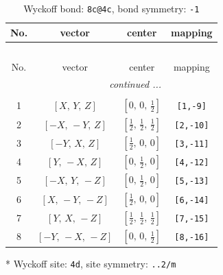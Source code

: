 \documentclass[fleqn,8pt]{jsarticle}
\begin{document}
\begin{longtable}{cccc}
\caption{Wyckoff bond: {\tt 8c@4c}, bond symmetry: {\tt -1}}
 \\
 \hline \hline
No. & vector & center & mapping \\ \hline \endfirsthead

\multicolumn{3}{l}{\tablename\ \thetable{}} \\
 \hline \hline
No. & vector & center & mapping \\ \hline \endhead

 \hline \hline
\multicolumn{3}{r}{\footnotesize\it continued ...} \\ \endfoot

 \hline \hline
\multicolumn{3}{r}{} \\ \endlastfoot

1 & $\left[ X,\, Y,\, Z \right]$ & $\left[ 0,\, 0,\, \frac{1}{2} \right]$ & {\tt [1,-9]} \\ \hline
2 & $\left[ - X,\, - Y,\, Z \right]$ & $\left[ \frac{1}{2},\, \frac{1}{2},\, \frac{1}{2} \right]$ & {\tt [2,-10]} \\ \hline
3 & $\left[ - Y,\, X,\, Z \right]$ & $\left[ \frac{1}{2},\, 0,\, 0 \right]$ & {\tt [3,-11]} \\ \hline
4 & $\left[ Y,\, - X,\, Z \right]$ & $\left[ 0,\, \frac{1}{2},\, 0 \right]$ & {\tt [4,-12]} \\ \hline
5 & $\left[ - X,\, Y,\, - Z \right]$ & $\left[ 0,\, \frac{1}{2},\, 0 \right]$ & {\tt [5,-13]} \\ \hline
6 & $\left[ X,\, - Y,\, - Z \right]$ & $\left[ \frac{1}{2},\, 0,\, 0 \right]$ & {\tt [6,-14]} \\ \hline
7 & $\left[ Y,\, X,\, - Z \right]$ & $\left[ \frac{1}{2},\, \frac{1}{2},\, \frac{1}{2} \right]$ & {\tt [7,-15]} \\ \hline
8 & $\left[ - Y,\, - X,\, - Z \right]$ & $\left[ 0,\, 0,\, \frac{1}{2} \right]$ & {\tt [8,-16]} \\
\end{longtable}
* Wyckoff site: {\tt 4d}, site symmetry: {\tt ..2/m}
\renewcommand{\arraystretch}{1.2}
\end{document}
